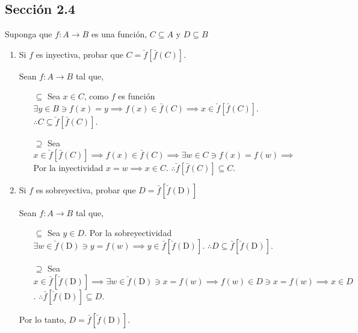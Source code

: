 \subsection{Sección 2.4}
\begin{problema}[Problema 2]
	Suponga que $f: A \rightarrow B$ es una función, $C \subseteq A$ y $D \subseteq B$
	\begin{enumerate}
		\item  Si $f$  es inyectiva, probar que $C=\breve{f}[\bar{f}(C)]$.
		\begin{dem}
	Sean $f:A\to B$ tal que,   
			\begin{enumerate}
				\item[$\subseteq$]  Sea $ x\in C$, como $f$ es función $\exists y \in B\ni f(x)=y\implies f(x)\in \bar{f}(C)\implies x\in \breve{f}[\bar{f}(C)]$.
				 $\therefore C\subseteq \breve{f}[\bar{f}(C)]$. 
				\item[$\supseteq$] Sea $x\in\breve{f}[\bar{f}(C)]\implies f(x)\in \bar{f}(C) \implies \exists w \in C \ni f(x)=f(w)\implies $ Por la inyectividad $x=w\implies x\in C$. $\therefore \breve{f}[\bar{f}(C)]\subseteq C$. 
			\end{enumerate}
			 
		\end{dem}
		\item Si $f$  es sobreyectiva, probar que $D=\bar{f}[\breve{f}(\mathrm{D})]$
		\begin{dem}
			Sean $f:A\to B$ tal que,   
				\begin{enumerate}
				\item[$\subseteq$] Sea $y\in D$. Por la sobreyectividad $\exists w \in \breve{f}(\mathrm{D}) \ni  y = f(w)\implies y \in \bar{f}[\breve{f}(\mathrm{D})]$. $\therefore D\subseteq\bar{f}[\breve{f}(\mathrm{D})]$. 
				\item[$\supseteq$] Sea $x\in \bar{f}[\breve{f}(\mathrm{D})] \implies \exists w \in \breve{f}(\mathrm{D}) \ni  x = f(w)\implies f(w)\in D\ni x=f(w)\implies x\in D$. $\therefore \bar{f}[\breve{f}(\mathrm{D})]\subseteq D$. 
			\end{enumerate}
		Por lo tanto, $D=\bar{f}[\breve{f}(\mathrm{D})]$. 
		\end{dem}
	\end{enumerate}
\end{problema}
